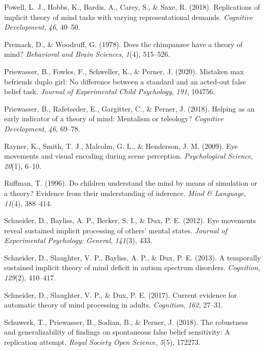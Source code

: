 \documentclass[
  man,floatsintext]{apa6}
\newlength{\cslhangindent}
\newenvironment{CSLReferences}[2] %
 {\begin{list}{}{%
  \setlength{\itemindent}{0pt}
  \setlength{\leftmargin}{0pt}
  \setlength{\parsep}{0pt}
  \ifodd #1
   \setlength{\leftmargin}{\cslhangindent}
   \setlength{\itemindent}{-1\cslhangindent}
  \fi
  \setlength{\itemsep}{#2\baselineskip}}}
 {\end{list}}
\begin{document}
\begin{CSLReferences}{1}{0}
Powell, L. J., Hobbs, K., Bardis, A., Carey, S., \& Saxe, R. (2018). Replications of implicit theory of mind tasks with varying representational demands. \emph{Cognitive Development}, \emph{46}, 40--50.

Premack, D., \& Woodruff, G. (1978). Does the chimpanzee have a theory of mind? \emph{Behavioral and Brain Sciences}, \emph{1}(4), 515--526.

Priewasser, B., Fowles, F., Schweller, K., \& Perner, J. (2020). Mistaken max befriends duplo girl: No difference between a standard and an acted-out false belief task. \emph{Journal of Experimental Child Psychology}, \emph{191}, 104756.

Priewasser, B., Rafetseder, E., Gargitter, C., \& Perner, J. (2018). Helping as an early indicator of a theory of mind: Mentalism or teleology? \emph{Cognitive Development}, \emph{46}, 69--78.

Rayner, K., Smith, T. J., Malcolm, G. L., \& Henderson, J. M. (2009). Eye movements and visual encoding during scene perception. \emph{Psychological Science}, \emph{20}(1), 6--10.

Ruffman, T. (1996). Do children understand the mind by means of simulation or a theory? Evidence from their understanding of inference. \emph{Mind \& Language}, \emph{11}(4), 388--414.

Schneider, D., Bayliss, A. P., Becker, S. I., \& Dux, P. E. (2012). Eye movements reveal sustained implicit processing of others' mental states. \emph{Journal of Experimental Psychology: General}, \emph{141}(3), 433.

Schneider, D., Slaughter, V. P., Bayliss, A. P., \& Dux, P. E. (2013). A temporally sustained implicit theory of mind deficit in autism spectrum disorders. \emph{Cognition}, \emph{129}(2), 410--417.

Schneider, D., Slaughter, V. P., \& Dux, P. E. (2017). Current evidence for automatic theory of mind processing in adults. \emph{Cognition}, \emph{162}, 27--31.

Schuwerk, T., Priewasser, B., Sodian, B., \& Perner, J. (2018). The robustness and generalizability of findings on spontaneous false belief sensitivity: A replication attempt. \emph{Royal Society Open Science}, \emph{5}(5), 172273.


\end{CSLReferences}
\end{document}

